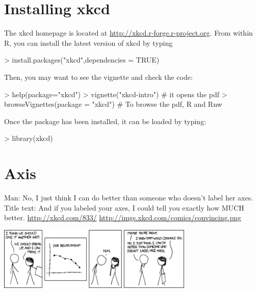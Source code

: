 \documentclass[10pt]{article}
\begin{document}
\section{Installing xkcd}

The xkcd homepage is located at \url{http://xkcd.r-forge.r-project.org}. 
From within R, you can install the latest version of xkcd by typing 
\begin{Schunk}
\begin{Sinput}
> install.packages("xkcd",dependencies = TRUE)
\end{Sinput}
\end{Schunk}

Then, you may want to see the vignette and check the code:
\begin{Schunk}
\begin{Sinput}
> help(package="xkcd")
> vignette("xkcd-intro") # it opens the pdf
> browseVignettes(package = "xkcd") # To browse the pdf, R and Rnw
\end{Sinput}
\end{Schunk}

Once the package has been installed, it can be loaded by typing:

\begin{Schunk}
\begin{Sinput}
> library(xkcd)
\end{Sinput}
\end{Schunk}


\section{Axis}




\begin{center}
    Man: No, I just think I can do better than someone who doesn't label her axes. Title text: And if you labeled your axes, I could tell you exactly how MUCH better.  {\tiny
    \url{http://xkcd.com/833/}
    \url{http://imgs.xkcd.com/comics/convincing.png}}
    
    \includegraphics[width=0.7\textwidth]{convincing}

   
\end{center}
\end{document}
